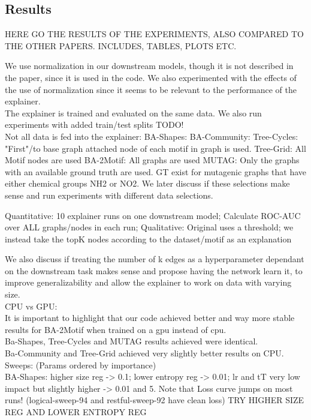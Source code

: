 \subsection{Results}

HERE GO THE RESULTS OF THE EXPERIMENTS, ALSO COMPARED TO THE OTHER PAPERS. INCLUDES, TABLES, PLOTS ETC.

We use normalization in our downstream models, though it is not described in the paper, since it is used in the code. We also experimented with the effects of the use of normalization since it seems to be relevant to the performance of the explainer. \\
The explainer is trained and evaluated on the same data. We also run experiments with added train/test splits TODO! \\
Not all data is fed into the explainer:
BA-Shapes: 
BA-Community:
Tree-Cycles: "First"/to base graph attached node of each motif in graph is used.
Tree-Grid: All Motif nodes are used
BA-2Motif: All graphs are used
MUTAG: Only the graphs with an available ground truth are used. GT exist for mutagenic graphs that have either chemical groups NH2 or NO2.
We later discuss if these selections make sense and run experiments with different data selections.

Quantitative: 10 explainer runs on one downstream model; Calculate ROC-AUC over ALL graphs/nodes in each run;
Qualitative: Original uses a threshold; we instead take the topK nodes according to the dataset/motif as an explanation

We also discuss if treating the number of k edges as a hyperparameter dependant on the downstream task makes sense and propose having the network learn it, to improve generalizability and allow the explainer to work on data with varying size. \\

CPU vs GPU: \\
It is important to highlight that our code achieved better and way more stable results for BA-2Motif when trained on a gpu instead of cpu. \\
Ba-Shapes, Tree-Cycles and MUTAG results achieved were identical. \\
Ba-Community and Tree-Grid achieved very slightly better results on CPU. \\

Sweeps: (Params ordered by importance)\\
BA-Shapes: higher size reg -> 0.1; lower entropy reg -> 0.01; lr and tT very low impact but slightly higher -> 0.01 and 5. Note that Loss curve jumps on most runs! (logical-sweep-94 and restful-sweep-92 have clean loss) TRY HIGHER SIZE REG AND LOWER ENTROPY REG \\

